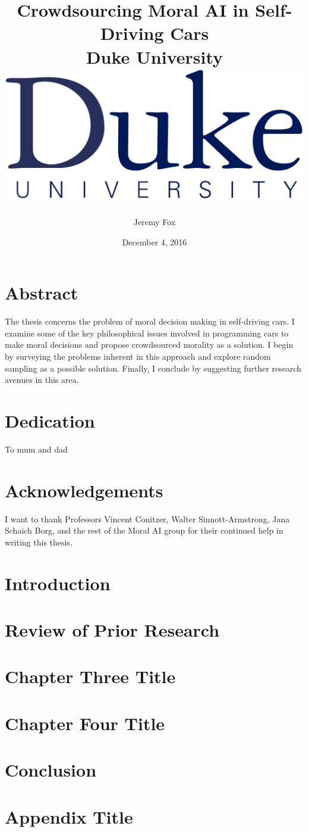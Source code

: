 \documentclass[12pt]{report}
\title{
	{Crowdsourcing Moral AI in Self-Driving Cars}\\
	{\large Duke University}\\
	{\includegraphics[width=\textwidth]{duke.png}}
}
\author{Jeremy Fox}
\date{December 4, 2016}
\begin{document}
\maketitle




\chapter*{Abstract}
The thesis concerns the problem of moral decision making in self-driving cars. I examine some of the key philosophical issues involved in programming cars to make moral decisions and propose crowdsourced morality as a solution. I begin by surveying the problems inherent in this approach and explore random sampling as a possible solution. Finally, I conclude by suggesting further research avenues in this area.

\chapter*{Dedication}
To mum and dad

\chapter*{Acknowledgements}
I want to thank Professors Vincent Conitzer, Walter Sinnott-Armstrong, Jana Schaich Borg, and the rest of the Moral AI group for their continued help in writing this thesis.

\tableofcontents

\chapter{Introduction}


\chapter{Review of Prior Research}


\chapter{Chapter Three Title}


\chapter{Chapter Four Title}


\chapter{Conclusion}


\appendix
\chapter{Appendix Title}





\end{document}

